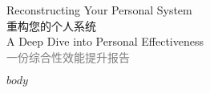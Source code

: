 \documentclass[a4paper,12pt]{article}
\title{\vspace{-2cm}}
\author{}
\date{}
\begin{document}
\begin{center}
    \fontsize{25pt}{30pt}\selectfont  Reconstructing Your Personal System\\
    \fontsize{20pt}{25pt}\selectfont  重构您的个人系统\textbar \\
    \fontsize{12pt}{15pt}\selectfont A Deep Dive into Personal Effectiveness\\
    \fontsize{12pt}{15pt}\selectfont\textcolor{gray}{一份综合性效能提升报告}
\end{center}

\begin{multicols}{2}
    \thispagestyle{firstpage}
    \onehalfspacing

    $body$

\end{multicols}
\end{document}
